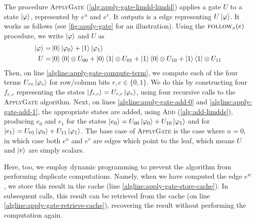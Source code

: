 The procedure \textsc{ApplyGate} (\autoref{alg:apply-gate-limdd-limdd}) applies a gate $U$ to a state $\ket{\varphi}$, represented by \limdds $e^u$ and $e^v$.
It outputs is a \limdd edge representing $U\ket{\varphi}$.
It works as follows (see \autoref{fig:apply-gate} for an illustration).
Using the $\textsc{follow}_{x}(e)$ procedure, we write $\ket{\varphi}$ and $U$ as
\begin{align}
	\ket{\varphi} = & \ket{0}\ket{\varphi_0}+\ket{1}\ket{\varphi_1} \\
	U = & \ket{0}\bra{0}\otimes U_{00} + \ket{0}\bra{1}\otimes U_{01} + \ket{1}\bra{0}\otimes U_{10} + \ket{1}\bra{1}\otimes U_{11}
\end{align}
Then, on line \ref{algline:apply-gate-compute-term}, we compute each of the four terms $U_{rc}\ket{\varphi_c}$ for row/column bits $r,c \in \{0,1\}$.
We do this by constructing four \limdds $f_{r,c}$ representing the states
$\ket{f_{r,c}}=U_{r,c}\ket{\varphi_c}$, using four recursive calls to the \textsc{ApplyGate} algorithm.
Next, on lines \ref{algline:apply-gate-add-0} and \ref{algline:apply-gate-add-1}, the appropriate states are added, using \textsc{Add} (\autoref{alg:add-limdds}), producing \limdds $e_0$ and $e_1$ for the states $\ket{e_0}=U_{00}\ket{\varphi_0}+U_{10}\ket{\varphi_1}$ and for $\ket{e_1}=U_{01}\ket{\varphi_0}+U_{11}\ket{\varphi_1}$.
The base case of \textsc{ApplyGate} is the case where $n=0$, in which case both $e^u$ and $e^v$ are edges which point to the leaf, which means $U$ and $\ket{v}$ are simply scalars.

Here, too, we employ dynamic programming to prevent the algorithm from performing duplicate computations.
Namely, when we have computed the edge $e^{w}$, we store this result in the cache (line \ref{algline:apply-gate-store-cache}).
In subsequent calls, this result can be retrieved from the cache (on line \ref{algline:apply-gate-retrieve-cache}), recovering the result without performing the computation again.



